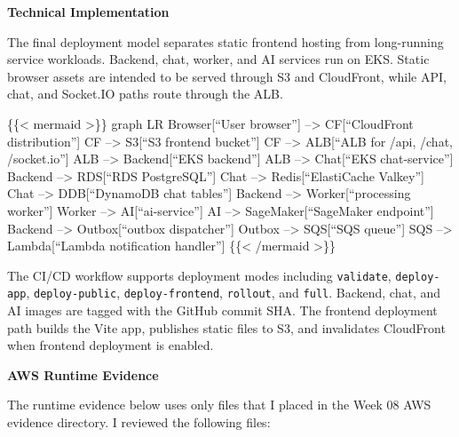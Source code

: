 \vspace{0.5em}\noindent\textbf{Technical Implementation}\par

The final deployment model separates static frontend hosting from
long-running service workloads. Backend, chat, worker, and AI services
run on EKS. Static browser assets are intended to be served through S3
and CloudFront, while API, chat, and Socket.IO paths route through the
ALB.

\{\{\textless{} mermaid \textgreater\}\} graph LR Browser{[}``User
browser''{]} --\textgreater{} CF{[}``CloudFront distribution''{]} CF
--\textgreater{} S3{[}``S3 frontend bucket''{]} CF --\textgreater{}
ALB{[}``ALB for /api, /chat, /socket.io''{]} ALB --\textgreater{}
Backend{[}``EKS backend''{]} ALB --\textgreater{} Chat{[}``EKS
chat-service''{]} Backend --\textgreater{} RDS{[}``RDS PostgreSQL''{]}
Chat --\textgreater{} Redis{[}``ElastiCache Valkey''{]} Chat
--\textgreater{} DDB{[}``DynamoDB chat tables''{]} Backend
--\textgreater{} Worker{[}``processing worker''{]} Worker
--\textgreater{} AI{[}``ai-service''{]} AI --\textgreater{}
SageMaker{[}``SageMaker endpoint''{]} Backend --\textgreater{}
Outbox{[}``outbox dispatcher''{]} Outbox --\textgreater{} SQS{[}``SQS
queue''{]} SQS --\textgreater{} Lambda{[}``Lambda notification
handler''{]} \{\{\textless{} /mermaid \textgreater\}\}

The CI/CD workflow supports deployment modes including
\texttt{validate}, \texttt{deploy-\allowbreak{}app}, \texttt{deploy-\allowbreak{}public},
\texttt{deploy-\allowbreak{}frontend}, \texttt{rollout}, and \texttt{full}. Backend,
chat, and AI images are tagged with the GitHub commit SHA. The frontend
deployment path builds the Vite app, publishes static files to S3, and
invalidates CloudFront when frontend deployment is enabled.

\vspace{0.5em}\noindent\textbf{AWS Runtime Evidence}\par

The runtime evidence below uses only files that I placed in the Week 08
AWS evidence directory. I reviewed the following files:

